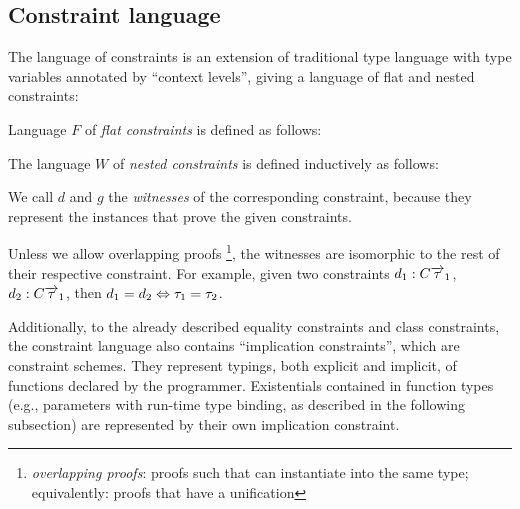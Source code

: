 \subsection{Constraint language}

The language of constraints is an extension of traditional type language with type variables annotated by ``context levels'', giving a language of flat and nested constraints:

\begin{defn}
    \label{def:defer_constr}

    Language $F$ of \emph{flat constraints} is defined as follows:

    \begin{center}\begin{grammar}
    \end{grammar}\end{center}

    The language $W$ of \emph{nested constraints} is defined inductively as follows:

    \begin{center}\begin{grammar}
    \end{grammar}\end{center}

    \label{constraint_language}
\end{defn}

We call $d$ and $g$ the \emph{witnesses} of the corresponding constraint, because they represent the instances that prove the given constraints.

\begin{remark}
    Unless we allow overlapping proofs \footnote{\emph{overlapping proofs}: proofs such that can instantiate into the same type; equivalently: proofs that have a unification}, the witnesses are isomorphic to the rest of their respective constraint. For example, given two constraints $d_1: C \overrightarrow{\tau}_1$, $d_2: C \overrightarrow{\tau}_1$, then $d_1 = d_2 \Leftrightarrow \tau_1 = \tau_2$.
\end{remark}

Additionally, to the already described equality constraints and class constraints, the constraint language also contains ``implication constraints'', which are constraint schemes. They represent typings, both explicit and implicit, of functions declared by the programmer. Existentials contained in function types (e.g., parameters with run-time type binding, as described in the following subsection) are represented by their own implication constraint.

